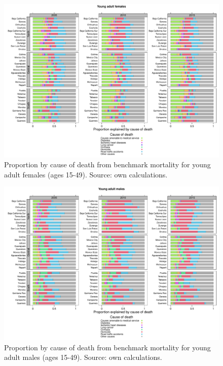 \documentclass[11.5pt]{article}
\begin{document}
{\begin{figure}
\centering
\caption{Proportion by cause of death from benchmark mortality for young adult females (ages 15-49). Source: own calculations.}
\begin{center}
\includegraphics[scale=.5]{Figure_prop_yaf.pdf}
\end{center}
\end{figure}


\begin{figure}
\centering
\caption{Proportion by cause of death from benchmark mortality for young adult males (ages 15-49). Source: own calculations.}
\begin{center}
\includegraphics[scale=.5]{Figure_prop_yam.pdf}
\end{center}
\end{figure}


}
\end{document}
